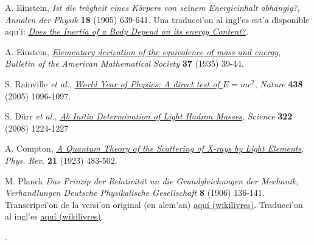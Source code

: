 \begin{thebibliography}{99}
 A. Einstein, \textit{Ist die tr\"agheit eines K\"orpers von seinem Energieinhalt abh\"angig?}, {\sl Annalen der Physik} {\bf 18} (1905) 639-641. Una traducci'on al ingl'es est'a disponible aqu'i: \href{{https://www.fourmilab.ch/etexts/einstein/E_mc2/e_mc2.pdf}}{\textit{Does the Inertia of a Body Depend on its energy Content?}}.

 A. Einstein, \href{http://www.ams.org/journals/bull/2000-37-01/S0273-0979-99-00805-8/S0273-0979-99-00805-8.pdf}
{\textit{Elementary derivation of the equivalence of mass and energy}}, {\sl Bulletin of the American Mathematical Society} {\bf 37} (1935) 39-44.

\cite{Rainville05} S. Rainville \textit{et al.}, \href{http://www.nature.com/nature/journal/v438/n7071/full/4381096a.html}{\it World Year of Physics: A direct test of $E=mc^2$}, {\sl Nature} {\bf 438} (2005) 1096-1097.

\cite{Duerr08} S. Dürr \textit{et al.}, \href{http://www.sciencemag.org/content/322/5905/1224.full}{\it Ab Initio Determination of Light Hadron Masses}, {\sl Science} {\bf 322} (2008) 1224-1227

 A. Compton, \href{http://prola.aps.org/abstract/PR/v21/i5/p483_1}{\it A Quantum Theory of the Scattering of X-rays by Light Elements}, {\sl Phys. Rev.} {\bf 21} (1923) 483-502.

 M. Planck {\it Das Prinzip der Relativit\"at un die Grundgleichungen der Mechanik}, {\sl Verhandlungen Deutsche Physikalische Gesellschaft} {\bf 8} (1906) 136-141. Transcripci'on de la versi'on original (en alem'an) \href{http://wikilivres.ca/wiki/Das_Prinzip_der_Relativit\%C3\%A4t_und_die_Grundgleichungen_der_Mechanik}{aqu\'i (wikilivres)}. Traducci'on al ingl'es  \href{http://en.wikisource.org/wiki/Translation:The_Principle_of_Relativity_and_the_Fundamental_Equations_of_Mechanics}{aqu\'i (wikilivres)}.

\end{thebibliography}.
